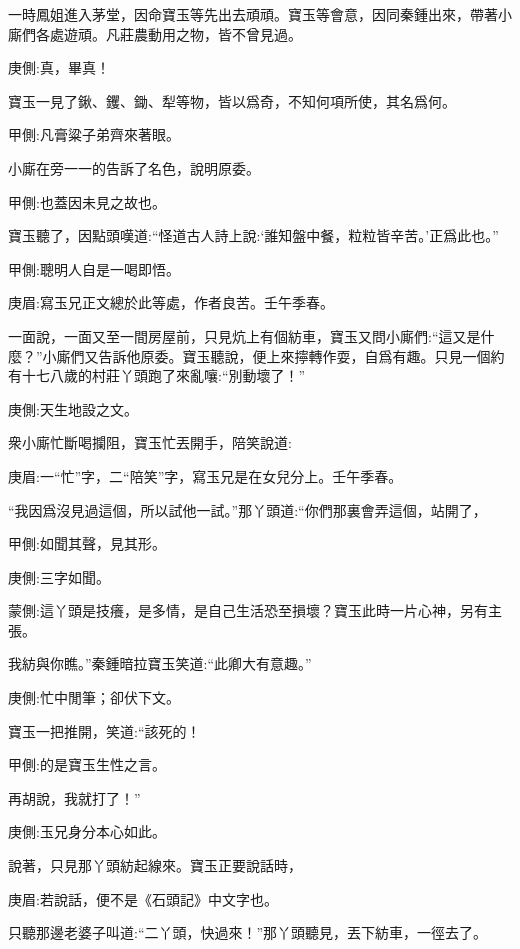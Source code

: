 \begin{parag}
    一時鳳姐進入茅堂，因命寶玉等先出去頑頑。寶玉等會意，因同秦鍾出來，帶著小廝們各處遊頑。凡莊農動用之物，皆不曾見過。\begin{note}庚側:真，畢真！\end{note}寶玉一見了鍬、钁、鋤、犁等物，皆以爲奇，不知何項所使，其名爲何。\begin{note}甲側:凡膏粱子弟齊來著眼。\end{note}小廝在旁一一的告訴了名色，說明原委。\begin{note}甲側:也蓋因未見之故也。\end{note}寶玉聽了，因點頭嘆道:“怪道古人詩上說:‘誰知盤中餐，粒粒皆辛苦。’正爲此也。”\begin{note}甲側:聰明人自是一喝即悟。\end{note}\begin{note}庚眉:寫玉兄正文總於此等處，作者良苦。壬午季春。\end{note}一面說，一面又至一間房屋前，只見炕上有個紡車，寶玉又問小廝們:“這又是什麼？”小廝們又告訴他原委。寶玉聽說，便上來擰轉作耍，自爲有趣。只見一個約有十七八歲的村莊丫頭跑了來亂嚷:“別動壞了！”\begin{note}庚側:天生地設之文。\end{note}衆小廝忙斷喝攔阻，寶玉忙丟開手，陪笑說道:\begin{note}庚眉:一“忙”字，二“陪笑”字，寫玉兄是在女兒分上。壬午季春。\end{note}“我因爲沒見過這個，所以試他一試。”那丫頭道:“你們那裏會弄這個，站開了，\begin{note}甲側:如聞其聲，見其形。\end{note}\begin{note}庚側:三字如聞。\end{note}\begin{note}蒙側:這丫頭是技癢，是多情，是自己生活恐至損壞？寶玉此時一片心神，另有主張。\end{note}我紡與你瞧。”秦鍾暗拉寶玉笑道:“此卿大有意趣。”\begin{note}庚側:忙中閒筆；卻伏下文。\end{note}寶玉一把推開，笑道:“該死的！\begin{note}甲側:的是寶玉生性之言。\end{note}再胡說，我就打了！”\begin{note}庚側:玉兄身分本心如此。\end{note}說著，只見那丫頭紡起線來。寶玉正要說話時，\begin{note}庚眉:若說話，便不是《石頭記》中文字也。\end{note}只聽那邊老婆子叫道:“二丫頭，快過來！”那丫頭聽見，丟下紡車，一徑去了。
\end{parag}



